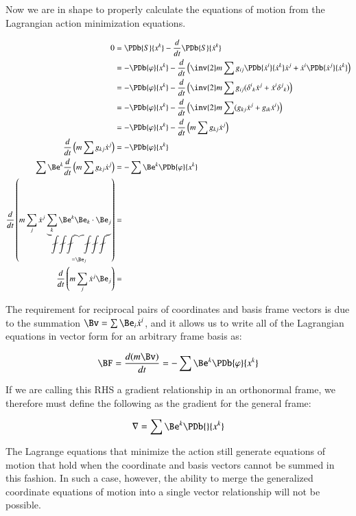 Now we are in shape to properly calculate the equations of motion from the Lagrangian action minimization equations.

\begin{align*}
0
&= \PDb{S}{x^k} - \frac{d}{dt}\PDb{S}{\dot{x}^k} \\
&= -\PDb{\varphi}{x^k} - \frac{d}{dt} \left( \inv{2} m \sum g_{ij} \PDb{\dot{x}^i}{\dot{x}^k} \dot{x}^j + \dot{x}^i \PDb{\dot{x}^j}{\dot{x}^k} \right) \\
&= -\PDb{\varphi}{x^k} - \frac{d}{dt} \left( \inv{2} m \sum g_{ij} ({\delta^i}_k \dot{x}^j + \dot{x}^i {\delta^j}_k) \right) \\
&= -\PDb{\varphi}{x^k} - \frac{d}{dt} \left( \inv{2} m \sum (g_{kj} \dot{x}^j + g_{ik}\dot{x}^i) \right) \\
&= -\PDb{\varphi}{x^k} - \frac{d}{dt} \left( m \sum g_{kj} \dot{x}^j \right) \\
\frac{d}{dt} \left( m \sum g_{kj} \dot{x}^j \right) &= -\PDb{\varphi}{x^k} \\
\sum \Be^k \frac{d}{dt} \left( m \sum g_{kj} \dot{x}^j \right) &= - \sum \Be^k \PDb{\varphi}{x^k} \\
\frac{d}{dt} \left( m \sum_j \dot{x}^j \underbrace{\sum_k \Be^k \Be_k \cdot \Be_j}_{=\Be_j} \right) &= \\
\frac{d}{dt} \left( m \sum_j \dot{x}^j \Be_j \right) &= \\
\end{align*}

The requirement for reciprocal pairs of coordinates and basis frame vectors is due to the
summation $\Bv = \sum \Be_i \dot{x}^i$, and it allows us to write all of the Lagrangian equations
in vector form for an arbitrary frame basis as:

\begin{equation}
\BF = \frac{d (m \Bv)}{dt} = - \sum \Be^k \PDb{\varphi}{x^k}
\end{equation}

If we are calling this RHS a gradient relationship in an orthonormal frame, we therefore must define
the following as the gradient for the general frame:

\begin{equation}\label{eqn:newtonLaG:gradient}
\grad = \sum \Be^k \PDb{}{x^k}
\end{equation}

The Lagrange equations that minimize the action still generate equations of
motion that hold when the coordinate and basis vectors cannot be summed in this fashion.
In such a case, however, the ability to merge the generalized coordinate equations of motion into a single
vector relationship will not be possible.

